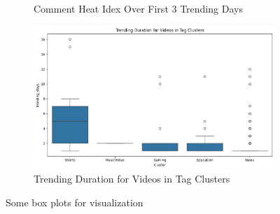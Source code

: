 \documentclass[a4paper]{article}
\begin{document}
\begin{figure}[h]
\begin{subfigure}{0.3\textwidth}
        \caption{Comment Heat Idex Over First 3 Trending Days}
        \label{fig:sub5}
    \end{subfigure}
    \begin{subfigure}{0.3\textwidth}
        \includegraphics[width=\linewidth]{other11.png}
        \caption{Trending Duration for Videos in Tag Clusters}
        \label{fig:sub5}
    \end{subfigure}
    \hfill
    \caption{Some box plots for visualization}
    \label{fig:multi}
\end{figure}
\end{document}
